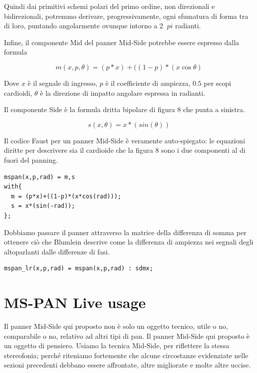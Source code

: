 Quindi dai primitivi schemi polari del primo ordine, non direzionali e
bidirezionali, potremmo derivare, progressivamente, ogni sfumatura di forma tra
di loro, puntando angolarmente ovunque intorno a 2 $ \ pi $ radianti.

Infine, il componente Mid del panner Mid-Side potrebbe essere espresso dalla
formula

\begin{equation}
m(x,p,\theta) = (p*x) + ((1-p)*(x\cos\theta)
\label{eq:mid}
\end{equation}

Dove $ x $ è il segnale di ingresso, $ p $ è il coefficiente di ampiezza, $0.5$
per scopi cardioidi, $\theta$ è la direzione di impatto angolare espressa in
radianti.

Il componente Side è la formula dritta bipolare di figura 8 che punta a sinistra.

\begin{equation}
s(x,\theta) = x*(sin(\theta))
\label{eq:mid}
\end{equation}

Il codice Faust per un panner Mid-Side è veramente auto-spiegato: le equazioni
diritte per descrivere sia il cardioide che la figura 8 sono i due componenti
al di fuori del panning.

\begin{lstlisting}
mspan(x,p,rad) = m,s
with{
  m = (p*x)+((1-p)*(x*cos(rad)));
  s = x*(sin(-rad));
};
\end{lstlisting}


Dobbiamo passare il panner attraverso la matrice della differenza di somma per
ottenere ciò che Blumlein descrive come la differenza di ampiezza nei segnali
degli altoparlanti dalle differenze di fasi.

\begin{lstlisting}
mspan_lr(x,p,rad) = mspan(x,p,rad) : sdmx;
\end{lstlisting}

\section{MS-PAN Live usage}

Il panner Mid-Side qui proposto non è solo un oggetto tecnico, utile o no,
comparabile o no, relativo ad altri tipi di pan. Il panner Mid-Side qui proposto
è un oggetto di pensiero. Usiamo la tecnica Mid-Side, per riflettere la stessa
stereofonia; perché riteniamo fortemente che alcune circostanze evidenziate
nelle sezioni precedenti debbano essere affrontate, altre migliorate e molte
altre uccise.

